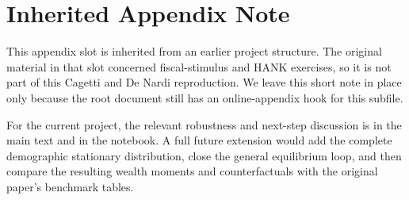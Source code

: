 \documentclass[\latexroot/\projectname]{subfiles}
\begin{document}
\FloatBarrier
\hypertarget{robustness}{}

\section*{Inherited Appendix Note}
\whenintegrated{\label{sec:robustness}}

This appendix slot is inherited from an earlier project structure. The original material in that slot concerned fiscal-stimulus and HANK exercises, so it is not part of this Cagetti and De Nardi reproduction. We leave this short note in place only because the root document still has an online-appendix hook for this subfile.

For the current project, the relevant robustness and next-step discussion is in the main text and in the notebook. A full future extension would add the complete demographic stationary distribution, close the general equilibrium loop, and then compare the resulting wealth moments and counterfactuals with the original paper's benchmark tables.

\smartbib
\end{document}
